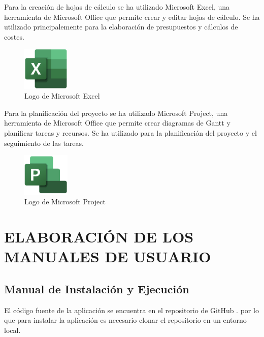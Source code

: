 Para la creación de hojas de cálculo se ha utilizado Microsoft Excel, una herramienta de Microsoft Office que permite crear y editar hojas de cálculo.
Se ha utilizado principalemente para la elaboración de presupuestos y cálculos de costes.

\begin{figure}[H]
    \centering
    \includegraphics[width=0.2\textwidth]{figures/7-Construccion/Excel.png}
    \caption{Logo de Microsoft Excel}
\end{figure}

Para la planificación del proyecto se ha utilizado Microsoft Project, una herramienta de Microsoft Office que permite crear diagramas de Gantt y planificar tareas y recursos.
Se ha utilizado para la planificación del proyecto y el seguimiento de las tareas.

\begin{figure}[H]
    \centering
    \includegraphics[width=0.2\textwidth]{figures/7-Construccion/Project.png}
    \caption{Logo de Microsoft Project}
\end{figure}



\newpage
\section{ELABORACIÓN DE LOS MANUALES DE USUARIO}

\subsection{Manual de Instalación y Ejecución}
El código fuente de la aplicación se encuentra en el repositorio de GitHub .
por lo que para instalar la aplicación es necesario clonar el repositorio en un entorno local.

